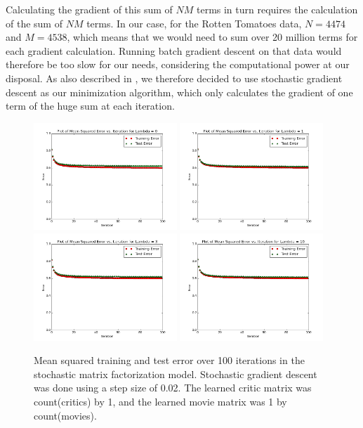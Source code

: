 \documentclass[12pt]{article}
\begin{document}
Calculating the gradient of this sum of $NM$ terms in turn requires the calculation of the sum of $NM$ terms. In our case, for the Rotten Tomatoes data, $N = 4474$ and $M = 4538$, which means that we would need to sum over 20 million terms for each gradient calculation. Running batch gradient descent on that data would therefore be too slow for our needs, considering the computational power at our disposal. As also described in \cite{Koren09}, we therefore decided to use stochastic gradient descent as our minimization algorithm, which only calculates the gradient of one term of the huge sum at each iteration.


	\begin{figure}[H]
	\centering
	\includegraphics[width=0.48\textwidth]{plots/test-i100d1l0.png}
	\includegraphics[width=0.48\textwidth]{plots/test-i100d1l1.png}
	\includegraphics[width=0.48\textwidth]{plots/test-i100d1l3.png}
	\includegraphics[width=0.48\textwidth]{plots/test-i100d1l10.png}
	\caption{Mean squared training and test error over 100 iterations in the stochastic matrix factorization model. Stochastic gradient descent was done using a step size of 0.02. The learned critic matrix was count(critics) by 1, and the learned movie matrix was 1 by count(movies).}
	\label{fig:1}
	\end{figure}
\end{document}
